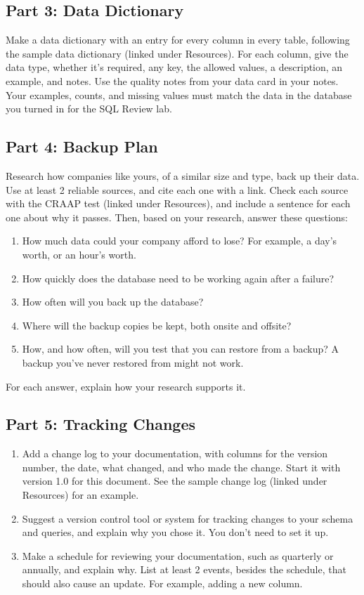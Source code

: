 \documentclass[12pt]{article}
\begin{document}
\subsection*{Part 3: Data Dictionary}
Make a data dictionary with an entry for every column in every table, following the sample data dictionary (linked under Resources). For each column, give the data type, whether it's required, any key, the allowed values, a description, an example, and notes. Use the quality notes from your data card in your notes. Your examples, counts, and missing values must match the data in the database you turned in for the SQL Review lab.

\subsection*{Part 4: Backup Plan}
Research how companies like yours, of a similar size and type, back up their data. Use at least 2 reliable sources, and cite each one with a link. Check each source with the CRAAP test (linked under Resources), and include a sentence for each one about why it passes. Then, based on your research, answer these questions:
\begin{enumerate}
    \item How much data could your company afford to lose? For example, a day's worth, or an hour's worth.
    \item How quickly does the database need to be working again after a failure?
    \item How often will you back up the database?
    \item Where will the backup copies be kept, both onsite and offsite?
    \item How, and how often, will you test that you can restore from a backup? A backup you've never restored from might not work.
\end{enumerate}
For each answer, explain how your research supports it.

\subsection*{Part 5: Tracking Changes}
\begin{enumerate}
    \item Add a change log to your documentation, with columns for the version number, the date, what changed, and who made the change. Start it with version 1.0 for this document. See the sample change log (linked under Resources) for an example.
    \item Suggest a version control tool or system for tracking changes to your schema and queries, and explain why you chose it. You don't need to set it up.
    \item Make a schedule for reviewing your documentation, such as quarterly or annually, and explain why. List at least 2 events, besides the schedule, that should also cause an update. For example, adding a new column.
\end{enumerate}
\end{document}
